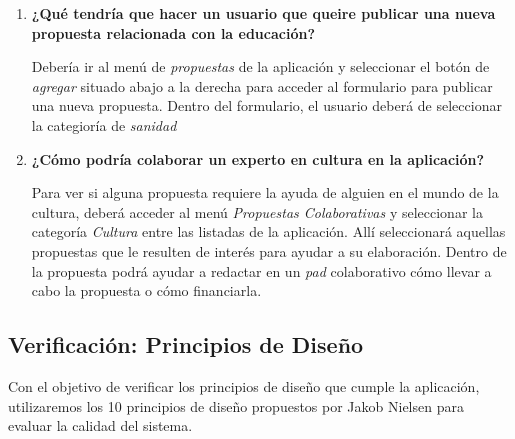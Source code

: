 \begin{enumerate}[label=\textbf{\Alph*}]
 \item \textbf{¿Qué tendría que hacer un usuario que queire publicar una nueva propuesta relacionada con la educación?}
 
 Debería ir al menú de \textit{propuestas} de la aplicación y seleccionar el botón de \textit{agregar} situado abajo a la derecha para acceder al formulario para publicar una nueva propuesta. Dentro del formulario, el usuario deberá de seleccionar la categioría de \textit{sanidad}
 
 \item \textbf{¿Cómo podría colaborar un experto en cultura en la aplicación?}
 
 Para ver si alguna propuesta requiere la ayuda de alguien en el mundo de la cultura, deberá acceder al menú \textit{Propuestas Colaborativas} y seleccionar la categoría \textit{Cultura} entre las listadas de la aplicación. Allí seleccionará aquellas propuestas que le resulten de interés para ayudar a su elaboración. Dentro de la propuesta podrá ayudar a redactar en un \textit{pad} colaborativo cómo llevar a cabo la propuesta o cómo financiarla.
 
\end{enumerate}

\subsection{Verificación: Principios de Diseño} \label{ssec:designPrinciples}

Con el objetivo de verificar los principios de diseño que cumple la aplicación, utilizaremos los 10 principios de diseño propuestos por Jakob Nielsen \cite{ref:nielsen} para evaluar la calidad del sistema.

